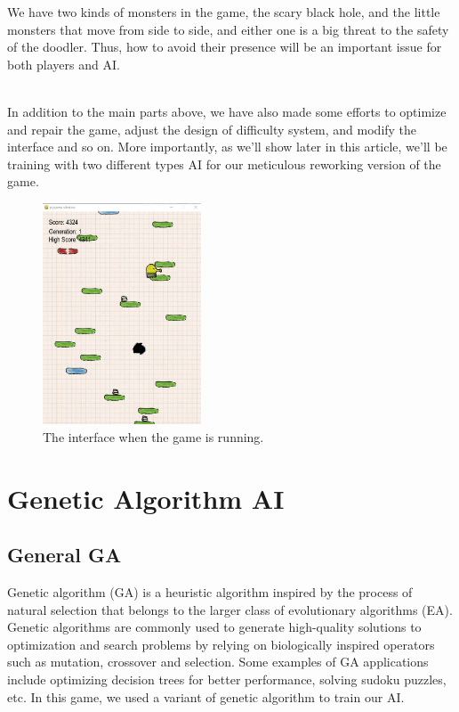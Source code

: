 \documentclass[final]{cvpr}
\begin{document}
We have two kinds of monsters in the game, the scary black hole, and the little monsters that move from side to side, and either one is a big threat to the safety of the doodler. Thus, how to avoid their presence will be an important issue for both players and AI.

~\\

In addition to the main parts above, we have also made some efforts to optimize and repair the game, adjust the design of difficulty system, and modify the interface and so on. More importantly, as we'll show later in this article, we'll be training with two  different types AI for our meticulous reworking version of the game.

\begin{figure}[htbp]
    \centering
    \includegraphics[width=0.42\textwidth]{1.png}
    \caption{The interface when the game is running. }
    \label{fig:game}
\end{figure}

\section{Genetic Algorithm AI}
\subsection{General GA}
   Genetic algorithm (GA) is a heuristic algorithm inspired by the process of natural selection that belongs to the larger class of evolutionary algorithms (EA). Genetic algorithms are commonly used to generate high-quality solutions to optimization and search problems by relying on biologically inspired operators such as mutation, crossover and selection. Some examples of GA applications include optimizing decision trees for better performance, solving sudoku puzzles, etc.
   In this game, we used a variant of genetic algorithm to train our AI.
\end{document}

